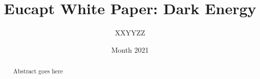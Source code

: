 \documentclass{article}
\title{Eucapt White Paper: Dark Energy}
\author{XXYYZZ}
\date{Month 2021}
\begin{document}
\maketitle
\begin{abstract}
    Abstract goes here
\end{abstract}


\tableofcontents








\end{document}
